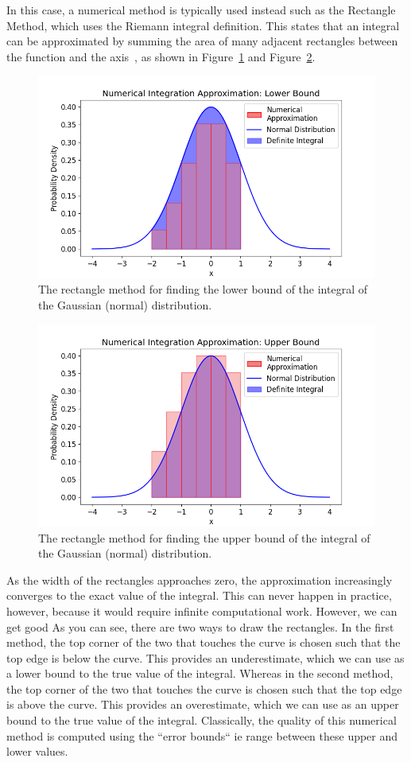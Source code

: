 \documentclass[12pt]{article}
\newcommand{\ndiFigCaption}[1]{The rectangle method for finding the #1 bound of the integral of the Gaussian (normal) distribution.}
\begin{document}
    In this case, a numerical method is typically used instead such as the Rectangle Method, which uses the Riemann integral definition.
    This states that an integral can be approximated by summing the area of many adjacent rectangles between the function and the axis~\cite{NumericalAnalysis2023}, as shown in Figure~\ref{fig:ndi-num_} and Figure~\ref{fig:ndi-num2_}.

    \begin{figure}[H]
        \centering
        \includegraphics[width=0.8\linewidth]{figures/ndi-num/ndi-num_}
        \caption{\ndiFigCaption{lower}}
        \label{fig:ndi-num_}
    \end{figure}

    \begin{figure}[H]
        \centering
        \includegraphics[width=0.8\linewidth]{figures/ndi-num2/ndi-num2_}
        \caption{\ndiFigCaption{upper}}
        \label{fig:ndi-num2_}
    \end{figure}
    As the width of the rectangles approaches zero, the approximation increasingly converges to the exact value of the integral.
    This can never happen in practice, however, because it would require infinite computational work.
    However, we can get good
    As you can see, there are two ways to draw the rectangles.
    In the first method, the top corner of the two that touches the curve is chosen such that the top edge is below the curve.
    This provides an underestimate, which we can use as a lower bound to the true value of the integral.
    Whereas in the second method, the top corner of the two that touches the curve is chosen such that the top edge is above the curve.
    This provides an overestimate, which we can use as an upper bound to the true value of the integral.
    Classically, the quality of this numerical method is computed using the ``error bounds`` ie range between these upper and lower values.
\end{document}
